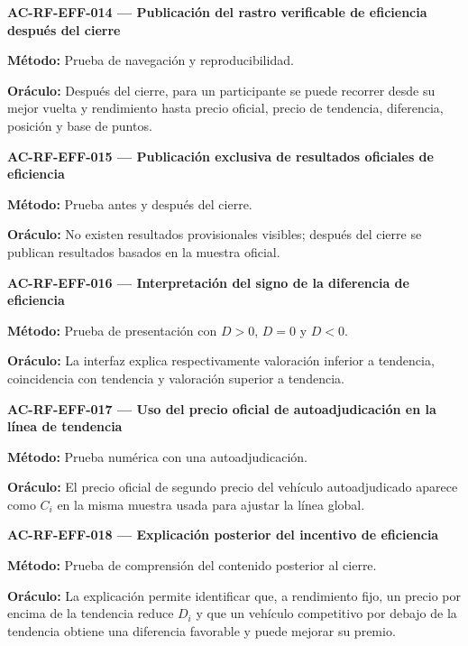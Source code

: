 \documentclass[10pt,letterpaper]{article}
\begin{document}
\noindent\textbf{AC-RF-EFF-014 --- Publicación del rastro verificable de eficiencia después del cierre}\par
\textbf{Método:} Prueba de navegación y reproducibilidad.\par
\textbf{Oráculo:} Después del cierre, para un participante se puede recorrer desde su mejor vuelta y rendimiento hasta precio oficial, precio de tendencia, diferencia, posición y base de puntos.\par\vspace{0.45em}
\noindent\textbf{AC-RF-EFF-015 --- Publicación exclusiva de resultados oficiales de eficiencia}\par
\textbf{Método:} Prueba antes y después del cierre.\par
\textbf{Oráculo:} No existen resultados provisionales visibles; después del cierre se publican resultados basados en la muestra oficial.\par\vspace{0.45em}
\noindent\textbf{AC-RF-EFF-016 --- Interpretación del signo de la diferencia de eficiencia}\par
\textbf{Método:} Prueba de presentación con $D>0$, $D=0$ y $D<0$.\par
\textbf{Oráculo:} La interfaz explica respectivamente valoración inferior a tendencia, coincidencia con tendencia y valoración superior a tendencia.\par\vspace{0.45em}
\noindent\textbf{AC-RF-EFF-017 --- Uso del precio oficial de autoadjudicación en la línea de tendencia}\par
\textbf{Método:} Prueba numérica con una autoadjudicación.\par
\textbf{Oráculo:} El precio oficial de segundo precio del vehículo autoadjudicado aparece como $C_i$ en la misma muestra usada para ajustar la línea global.\par\vspace{0.45em}
\noindent\textbf{AC-RF-EFF-018 --- Explicación posterior del incentivo de eficiencia}\par
\textbf{Método:} Prueba de comprensión del contenido posterior al cierre.\par
\textbf{Oráculo:} La explicación permite identificar que, a rendimiento fijo, un precio por encima de la tendencia reduce $D_i$ y que un vehículo competitivo por debajo de la tendencia obtiene una diferencia favorable y puede mejorar su premio.\par\vspace{0.45em}
\end{document}

